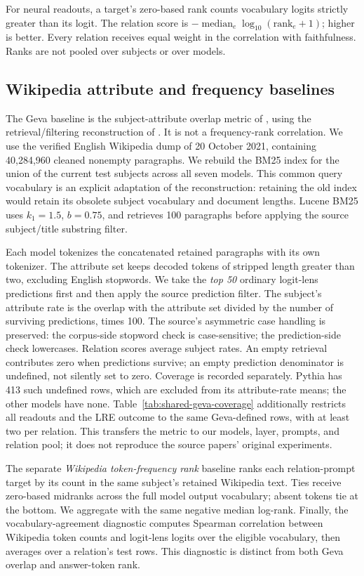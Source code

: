 For neural readouts, a target's zero-based rank counts vocabulary logits
strictly greater than its logit. The relation score is
$-\operatorname{median}_e\log_{10}(\mathrm{rank}_e+1)$; higher is better.
Every relation receives equal weight in the correlation with faithfulness.
Ranks are not pooled over subjects or over models.

\subsection{Wikipedia attribute and frequency baselines}

The Geva baseline is the subject-attribute overlap metric of
\citet{geva2023dissecting}, using the retrieval/filtering reconstruction of
\citet{gerstner2026weakening}. It is not a frequency-rank correlation.
We use the verified English Wikipedia dump of 20 October 2021, containing
40,284,960 cleaned nonempty paragraphs. We rebuild the BM25 index for the
union of the current test subjects across all seven models. This common
query vocabulary is an explicit adaptation of the reconstruction: retaining
the old index would retain its obsolete subject vocabulary and document
lengths. Lucene BM25 uses $k_1=1.5$, $b=0.75$, and retrieves 100 paragraphs
before applying the source subject/title substring filter.

Each model tokenizes the concatenated retained paragraphs with its own
tokenizer. The attribute set keeps decoded tokens of stripped length greater
than two, excluding English stopwords. We take the \emph{top 50} ordinary
logit-lens predictions first and then apply the source prediction filter.
The subject's attribute rate is the overlap with the attribute set divided
by the number of surviving predictions, times 100. The source's asymmetric
case handling is preserved: the corpus-side stopword check is case-sensitive;
the prediction-side check lowercases. Relation scores average subject rates.
An empty retrieval contributes zero when predictions survive; an empty
prediction denominator is undefined, not silently set to zero. Coverage is
recorded separately. Pythia has 413 such undefined rows, which are excluded
from its attribute-rate means; the other models have none.
Table~\ref{tab:shared-geva-coverage} additionally restricts all readouts and
the LRE outcome to the same Geva-defined rows, with at least two per relation.
This transfers the metric to our models, layer, prompts,
and relation pool; it does not reproduce the source papers' original experiments.

The separate \emph{Wikipedia token-frequency rank} baseline ranks each
relation-prompt target by its count in the same subject's retained Wikipedia
text. Ties receive zero-based midranks across the full model output
vocabulary; absent tokens tie at the bottom. We aggregate with the same
negative median log-rank. Finally, the vocabulary-agreement diagnostic
computes Spearman correlation between Wikipedia token counts and logit-lens
logits over the eligible vocabulary, then averages over a relation's test
rows. This diagnostic is distinct from both Geva overlap and answer-token rank.

